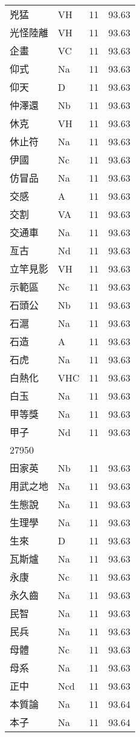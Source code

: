\documentclass[twocolumn]{book}
\begin{document}
\begin{supertabular}{llrr}
兇猛 & VH & 11 &  93.63\\
光怪陸離 & VH & 11 &  93.63\\
企畫 & VC & 11 &  93.63\\
仰式 & Na & 11 &  93.63\\
仰天 & D & 11 &  93.63\\
仲澤還 & Nb & 11 &  93.63\\
休克 & VH & 11 &  93.63\\
休止符 & Na & 11 &  93.63\\
伊國 & Nc & 11 &  93.63\\
仿冒品 & Na & 11 &  93.63\\
交感 & A & 11 &  93.63\\
交割 & VA & 11 &  93.63\\
交通車 & Na & 11 &  93.63\\
亙古 & Nd & 11 &  93.63\\
立竿見影 & VH & 11 &  93.63\\
示範區 & Nc & 11 &  93.63\\
石頭公 & Nb & 11 &  93.63\\
石滬 & Na & 11 &  93.63\\
石造 & A & 11 &  93.63\\
石虎 & Na & 11 &  93.63\\
白熱化 & VHC & 11 &  93.63\\
白玉 & Na & 11 &  93.63\\
甲等獎 & Na & 11 &  93.63\\
甲子 & Nd & 11 &  93.63\\
27950\\
田家英 & Nb & 11 &  93.63\\
用武之地 & Na & 11 &  93.63\\
生態說 & Na & 11 &  93.63\\
生理學 & Na & 11 &  93.63\\
生來 & D & 11 &  93.63\\
瓦斯爐 & Na & 11 &  93.63\\
永康 & Nc & 11 &  93.63\\
永久齒 & Na & 11 &  93.63\\
民智 & Na & 11 &  93.63\\
民兵 & Na & 11 &  93.63\\
母體 & Nc & 11 &  93.63\\
母系 & Na & 11 &  93.63\\
正中 & Ncd & 11 &  93.63\\
本質論 & Na & 11 &  93.64\\
本子 & Na & 11 &  93.64\\

\end{supertabular}
\end{document}
